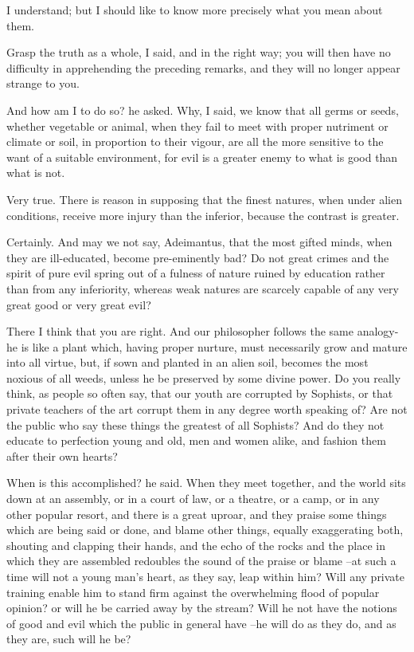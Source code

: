 I understand; but I should like to know more precisely what you mean about them.

Grasp the truth as a whole, I said, and in the right way; you will then have no difficulty in apprehending the preceding remarks, and they will no longer appear strange to you.

And how am I to do so? he asked.
Why, I said, we know that all germs or seeds, whether vegetable or animal, when they fail to meet with proper nutriment or climate or soil, in proportion to their vigour, are all the more sensitive to the want of a suitable environment, for evil is a greater enemy to what is good than what is not.

Very true.
There is reason in supposing that the finest natures, when under alien conditions, receive more injury than the inferior, because the contrast is greater.

Certainly.
And may we not say, Adeimantus, that the most gifted minds, when they are ill-educated, become pre-eminently bad? Do not great crimes and the spirit of pure evil spring out of a fulness of nature ruined by education rather than from any inferiority, whereas weak natures are scarcely capable of any very great good or very great evil?

There I think that you are right.
And our philosopher follows the same analogy-he is like a plant which, having proper nurture, must necessarily grow and mature into all virtue, but, if sown and planted in an alien soil, becomes the most noxious of all weeds, unless he be preserved by some divine power. Do you really think, as people so often say, that our youth are corrupted by Sophists, or that private teachers of the art corrupt them in any degree worth speaking of? Are not the public who say these things the greatest of all Sophists? And do they not educate to perfection young and old, men and women alike, and fashion them after their own hearts?

When is this accomplished? he said.
When they meet together, and the world sits down at an assembly, or in a court of law, or a theatre, or a camp, or in any other popular resort, and there is a great uproar, and they praise some things which are being said or done, and blame other things, equally exaggerating both, shouting and clapping their hands, and the echo of the rocks and the place in which they are assembled redoubles the sound of the praise or blame --at such a time will not a young man's heart, as they say, leap within him? Will any private training enable him to stand firm against the overwhelming flood of popular opinion? or will he be carried away by the stream? Will he not have the notions of good and evil which the public in general have --he will do as they do, and as they are, such will he be?


